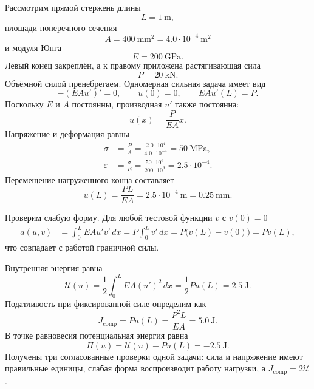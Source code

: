 Рассмотрим прямой стержень длины
\[
 L=1\ \mathrm{m},
\]
площади поперечного сечения
\[
 A=400\ \mathrm{mm}^2=4.0\cdot10^{-4}\ \mathrm{m}^2
\]
и модуля Юнга
\[
 E=200\ \mathrm{GPa}.
\]
Левый конец закреплён, а к правому приложена растягивающая сила
\[
 P=20\ \mathrm{kN}.
\]
Объёмной силой пренебрегаем. Одномерная сильная задача имеет вид
\begin{equation}
\label{eq:bar-strong-v04}
 -(EAu')'=0,
 \qquad
 u(0)=0,
 \qquad
 EAu'(L)=P.
\end{equation}
Поскольку $E$ и $A$ постоянны, производная $u'$ также постоянна:
\begin{equation}
\label{eq:bar-solution-v04}
 u(x)=\frac{P}{EA}x.
\end{equation}
Напряжение и деформация равны
\begin{align}
 \sigma
 &=\frac{P}{A}
 =\frac{2.0\cdot10^4}{4.0\cdot10^{-4}}
 =50\ \mathrm{MPa},
 \label{eq:bar-stress-v04}\\
 \varepsilon
 &=\frac{\sigma}{E}
 =\frac{50\cdot10^6}{200\cdot10^9}
 =2.5\cdot10^{-4}.
 \label{eq:bar-strain-v04}
\end{align}
Перемещение нагруженного конца составляет
\begin{equation}
\label{eq:bar-tip-displacement-v04}
 u(L)
 =\frac{PL}{EA}
 =2.5\cdot10^{-4}\ \mathrm{m}
 =0.25\ \mathrm{mm}.
\end{equation}

Проверим слабую форму. Для любой тестовой функции $v$ с $v(0)=0$
\begin{align}
 a(u,v)
 &=\int_0^L EAu'v'\,dx
 =P\int_0^L v'\,dx
 =P\bigl(v(L)-v(0)\bigr)
 =Pv(L),
 \label{eq:bar-weak-check-v04}
\end{align}
что совпадает с работой граничной силы.

Внутренняя энергия равна
\begin{equation}
\label{eq:bar-energy-v04}
 \mathcal U(u)
 =\frac12\int_0^L EA(u')^2\,dx
 =\frac12P u(L)
 =2.5\ \mathrm{J}.
\end{equation}
Податливость при фиксированной силе определим как
\begin{equation}
\label{eq:bar-compliance-v04}
 J_{\mathrm{comp}}
 =P u(L)
 =\frac{P^2L}{EA}
 =5.0\ \mathrm{J}.
\end{equation}
В точке равновесия потенциальная энергия равна
\begin{equation}
\label{eq:bar-potential-v04}
 \Pi(u)
 =\mathcal U(u)-Pu(L)
 =-2.5\ \mathrm{J}.
\end{equation}
Получены три согласованные проверки одной задачи: сила и напряжение имеют правильные единицы, слабая форма воспроизводит работу нагрузки, а $J_{\mathrm{comp}}=2\mathcal U$.

